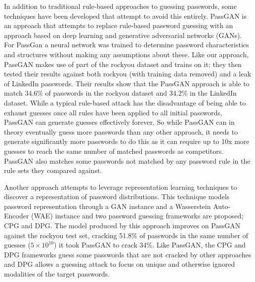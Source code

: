 \documentclass[letterpaper,twocolumn,10pt]{article}
\begin{document}
In addition to traditional rule-based approaches to guessing passwords, some
techniques have been developed that attempt to avoid this entirely.
PassGAN\cite{hitaj2019passgan} is an approach that attempts to replace
rule-based password guessing with an approach based on deep learning and
generative adversarial networks (GANs). For PassGan a neural network was
trained to determine password characteristics and structures without making any
assumptions about these. Like our approach, PassGAN makes use of part of the
rockyou dataset and trains on it; they then tested their results against both
rockyou (with training data removed) and a leak of LinkedIn passwords. Their
results show that the PassGAN approach is able to match 34.6\% of passwords in
the rockyou dataset and 34.2\% in the LinkedIn dataset. While a typical
rule-based attack has the disadvantage of being able to exhaust guesses once
all rules have been applied to all initial passwords, PassGAN can generate
guesses effectively forever. So while PassGAN can in theory eventually guess
more passwords than any other approach, it needs to generate significantly more
passwords to do this as it can require up to 10x more guesses to reach the same
number of matched passwords as competitors. PassGAN also matches some passwords
not matched by any password rule in the rule sets they compared against.

Another approach\cite{pasquini2021improving} attempts to leverage
representation learning techniques to discover a representation of password
distributions. This technique models password representation through a GAN
instance and a Wasserstein Auto-Encoder (WAE) instance and two password guessing
frameworks are proposed; CPG and DPG. The model produced by this approach
improves on PassGAN against the rockyou test set, cracking 51.8\% of passwords
in the same number of guesses ($5 \times 10^{10}$) it took PassGAN to crack 34\%.
Like PassGAN, the CPG and DPG frameworks guess some passwords that are not
cracked by other approaches and DPG allows a guessing attack to focus on unique
and otherwise ignored modalities of the target passwords.



\end{document}
